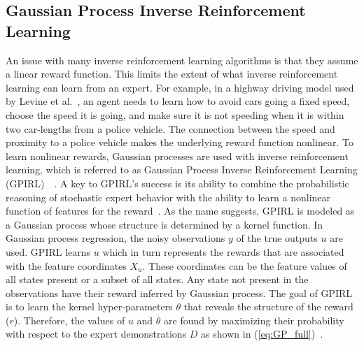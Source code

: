\documentclass[12pt,american]{report}
\begin{document}
\subsection{Gaussian Process Inverse Reinforcement Learning}
\label{sec:gpirl}
An issue with many inverse reinforcement learning algorithms is that they assume a linear reward function.  This limits the extent of what inverse reinforcement learning can learn from an expert.  For example, in a highway driving model used by Levine et al.~\cite{levine2011nonlinear}, an agent needs to learn how to avoid cars going a fixed speed, choose the speed it is going, and make sure it is not speeding when it is within two car-lengths from a police vehicle.  The connection between the speed and proximity to a police vehicle makes the underlying reward function nonlinear. To learn nonlinear rewards, Gaussian processes are used with inverse reinforcement learning, which is referred to as Gaussian Process Inverse Reinforcement Learning (GPIRL)~\cite{qiao2011inverse}~\cite{levine2011nonlinear}. A key to GPIRL's success is its ability to combine the probabilistic reasoning of stochastic expert behavior with the ability to learn a nonlinear function of features for the reward~\cite{levine2011nonlinear}. As the name suggests, GPIRL is modeled as a Gaussian process whose structure is determined by a kernel function. In Gaussian process regression, the noisy observations $y$ of the true outputs $u$ are used.  GPIRL learns $u$ which in turn represents the rewards that are associated with the feature coordinates $X_u$. These coordinates can be the feature values of all states present or a subset of all states. Any state not present in the observations have their reward inferred by Gaussian process.  The goal of GPIRL is to learn the kernel hyper-parameters $\theta$ that reveals the structure of the reward ($r$). Therefore, the values of $u$ and $\theta$ are found by maximizing their probability with respect to the expert demonstrations $D$ as shown in (\ref{eq:GP_full})~\cite{levine2011nonlinear}.
\end{document}
